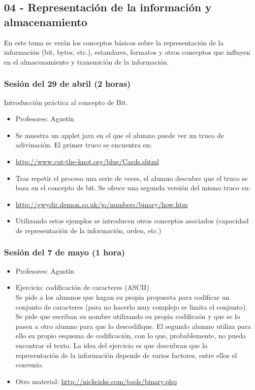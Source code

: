 \documentclass[a4paper,12pt]{article}
\begin{document}
\subsection{04 - Representación de la información y almacenamiento}

En este tema se verán los conceptos básicos sobre la representación de la información (bit, bytes, etc.), estandares, formatos y otros conceptos que influyen en el almacenamiento y transmición de la información.

\subsubsection{Sesión del 29 de abril (2 horas)}

Introducción práctica al concepto de Bit.

\begin{itemize}
\item Profesores: Agustín
\item Se muestra un applet java en el que el alumno puede ver un truco de adivinación. El primer truco se encuentra en:
\item \url{http://www.cut-the-knot.org/blue/Cards.shtml}
\item Tras repetir el proceso una serie de veces, el alumno descubre que el truco se basa en el concepto de bit. Se ofrece una segunda versión del mismo truco en:
\item \url{http://gwydir.demon.co.uk/jo/numbers/binary/how.htm}
\item Utilizando estos ejemplos se introducen otros conceptos asociados (capacidad de representación de la información, orden, etc.)
\end{itemize}

\subsubsection{Sesión del 7 de mayo (1 hora)}

\begin{itemize}
\item Profesores: Agustín
\item Ejercicio: codificación de caracteres (ASCII) \\
Se pide a los alumnos que hagan su propia propuesta para codificar un conjunto de caracteres (para no hacerlo muy complejo se limita el conjunto). Se pide que escriban su nombre utilizando su propia codificaón y que se lo pasen a otro alumno para que lo descodifique. El segundo alumno utiliza para ello su propio esquema de codificación, con lo que, probablemente, no pueda encontrar el texto. La idea del ejercicio es que descubran que la representación de la información depende de varios factores, entre ellos el convenio.
\item Otro material: \url{http://nickciske.com/tools/binary.php}
\end{itemize}
\end{document}
